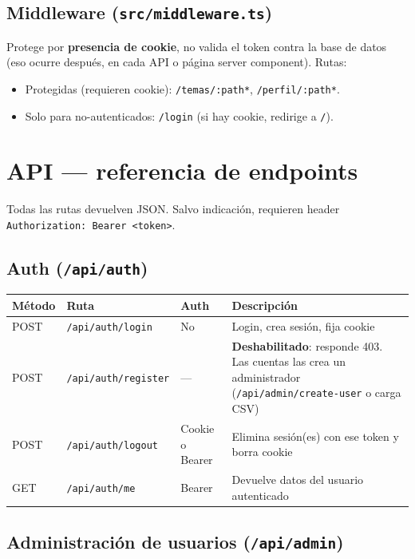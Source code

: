 \documentclass[11pt,a4paper]{article}
\newcommand{\code}[1]{\texttt{#1}}
\begin{document}
\subsection{Middleware (\code{src/middleware.ts})}

Protege por \textbf{presencia de cookie}, no valida el token contra la base de datos (eso ocurre después, en cada API o página server component). Rutas:

\begin{itemize}
  \item Protegidas (requieren cookie): \code{/temas/:path*}, \code{/perfil/:path*}.
  \item Solo para no-autenticados: \code{/login} (si hay cookie, redirige a \code{/}).
\end{itemize}

\section{API --- referencia de endpoints}

Todas las rutas devuelven JSON. Salvo indicación, requieren header \code{Authorization: Bearer <token>}.

\subsection{Auth (\code{/api/auth})}

\begin{longtable}{@{}p{1.4cm}p{4.3cm}p{2.2cm}p{6.5cm}@{}}
\toprule
\textbf{Método} & \textbf{Ruta} & \textbf{Auth} & \textbf{Descripción} \\
\midrule
\endhead
POST & \code{/api/auth/login} & No & Login, crea sesión, fija cookie \\
POST & \code{/api/auth/register} & --- & \textbf{Deshabilitado}: responde 403. Las cuentas las crea un administrador (\code{/api/admin/create-user} o carga CSV) \\
POST & \code{/api/auth/logout} & Cookie o Bearer & Elimina sesión(es) con ese token y borra cookie \\
GET & \code{/api/auth/me} & Bearer & Devuelve datos del usuario autenticado \\
\bottomrule
\end{longtable}

\subsection{Administración de usuarios (\code{/api/admin})}
\end{document}
